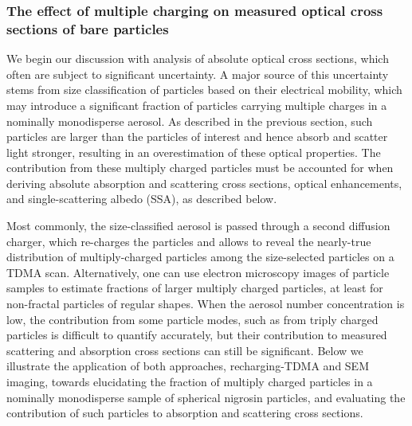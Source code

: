 \label{sec:optical}

\subsubsection{The effect of multiple charging on measured optical cross sections of bare particles}

We begin our discussion with analysis of absolute optical cross sections, which often are subject to significant uncertainty. A major source of this uncertainty stems from size classification of particles based on their electrical mobility, which may introduce a significant fraction of particles carrying multiple charges in a nominally monodisperse aerosol. As described in the previous section, such particles are larger than the particles of interest and hence absorb and scatter light stronger, resulting in an overestimation of these optical properties. The contribution from these multiply charged particles must be accounted for when deriving absolute absorption and scattering cross sections, optical enhancements, and single-scattering albedo (SSA), as described below.

Most commonly, the size-classified aerosol is passed through a second diffusion charger, which re-charges the particles and allows to reveal the nearly-true distribution of multiply-charged particles among the size-selected particles on a TDMA scan. Alternatively, one can use electron microscopy images of particle samples to estimate fractions of larger multiply charged particles, at least for non-fractal particles of regular shapes. When the aerosol number concentration is low, the contribution from some particle modes, such as from triply charged particles is difficult to quantify accurately, but their contribution to measured scattering and absorption cross sections can still be significant. Below we illustrate the application of both approaches, recharging-TDMA and SEM imaging, towards elucidating the fraction of multiply charged particles in a nominally monodisperse sample of spherical nigrosin particles, and evaluating the contribution of such particles to absorption and scattering cross sections.

